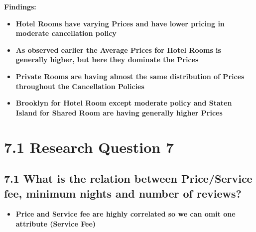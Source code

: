 \documentclass[11pt]{article}
\providecommand{\tightlist}{%
      \setlength{\itemsep}{0pt}\setlength{\parskip}{0pt}}
\begin{document}
    
    
    \textbf{Findings:}

\begin{itemize}
\tightlist
\item
  \textbf{Hotel Rooms have varying Prices and have lower pricing in
  moderate cancellation policy}
\item
  \textbf{As observed earlier the Average Prices for Hotel Rooms is
  generally higher, but here they dominate the Prices}
\item
  \textbf{Private Rooms are having almost the same distribution of
  Prices throughout the Cancellation Policies}
\item
  \textbf{Brooklyn for Hotel Room except moderate policy and Staten
  Island for Shared Room are having generally higher Prices}
\end{itemize}

    \hypertarget{research-question-7}{%
\section{7.1 Research Question 7}\label{research-question-7}}

\hypertarget{what-is-the-relation-between-priceservice-fee-minimum-nights-and-number-of-reviews}{%
\subsection{7.1 What is the relation between Price/Service fee, minimum
nights and number of
reviews?}\label{what-is-the-relation-between-priceservice-fee-minimum-nights-and-number-of-reviews}}

\begin{itemize}
\tightlist
\item
  \textbf{Price and Service fee are highly correlated so we can omit one
  attribute (Service Fee)}
\end{itemize}
\end{document}

